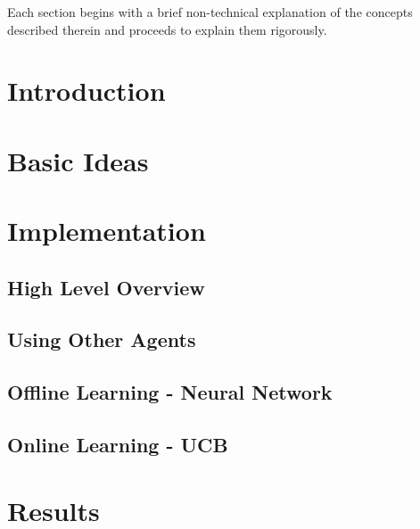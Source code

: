 \documentclass[12pt]{article}
\numberwithin{equation}{section}
\begin{document}
			Each section begins with a brief non-technical explanation of the concepts described therein and proceeds to explain them rigorously.

	\newpage

	\tableofcontents

	\newpage

	\section{Introduction}		\label{sec:introduction}

		

	\section{Basic Ideas}		\label{sec:basic_ideas}

		

	\section{Implementation}		\label{sec:implementation}

		\subsection{High Level Overview}	\label{sec:implementation.high_level_view}

			

		\subsection{Using Other Agents}		\label{sec:implementation.using_other_agents}

			

		\subsection{Offline Learning - Neural Network}		\label{sec:implementation.neural_network}

			
		
		\subsection{Online Learning - UCB}		\label{sec:implementation.ucb}

			

	\section{Results}		\label{sec:results}	%
\end{document}
